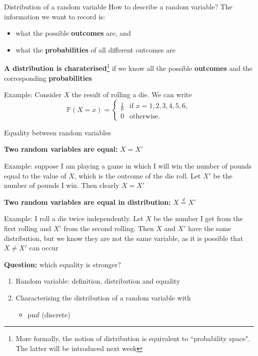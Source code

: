 \documentclass{beamer}
\begin{document}
\begin{frame}{Distribution of a random variable}
How to describe a random variable?  The information we want to record is:
\begin{itemize}
\item what the possible {\bf outcomes} are, and
\item what the {\bf probabilities} of all different outcomes are
\end{itemize}
{\bf A distribution is charaterised}\footnote{More formally, the notion of distribution is equivalent to  ``probability space". The latter will be introduced next week} if we know all the possible {\bf outcomes} and the corresponding {\bf probabilities}

Example: Consider \(X\) the result of rolling a die. We can write
\begin{equation}\label{x=x}
\mathbb P(X=x)=
\begin{cases}
\frac{1}{6} & \text{if }x=1,2,3,4,5,6,\\
0 & \text{otherwise.}
\end{cases}
\end{equation}

\end{frame}


\begin{frame}{Equality between random variables}

{\bf Two random variables are equal:} $X=X'$

Example: suppose I am playing a game in which I will win the number of pounds equal to the value of $X$, which is the outcome of the die roll. Let $X'$ be the number of pounds I win. Then clearly $X=X'$



{\bf Two random variables are equal in distribution:} $X\stackrel{d}{=}X'$

Example: I roll a die twice independently. Let $X$ be the number I get from the first rolling and $X'$ from the second rolling. Then $X$ and $X'$ have the same distribution, but we know they are not the same variable, as it is possible that $X\neq X'$ can occur


 
{\bf Question:} which equality is stronger?
\end{frame}

\begin{frame}
\begin{enumerate}
\item Random variable: definition, distribution and equality 
\item Characterising the distribution of a random variable with
\begin{itemize}
\item pmf (discrete)
\end{itemize}

\end{enumerate}
\end{frame}
\end{document}
